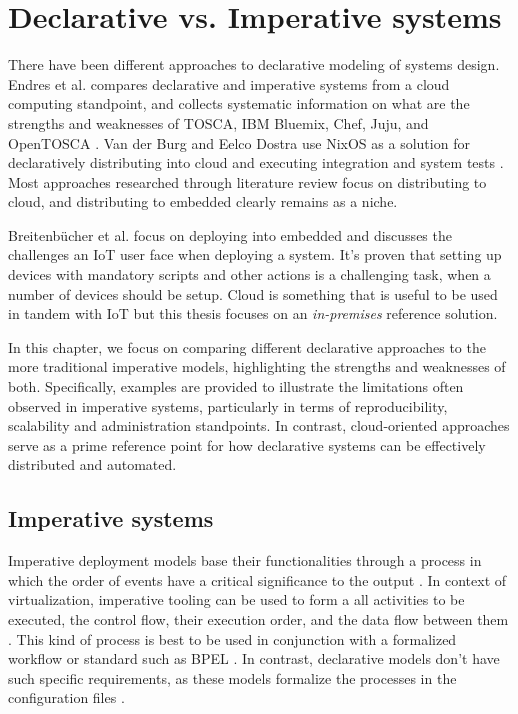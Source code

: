 \chapter{Declarative vs. Imperative systems} \label{imperative}

There have been different approaches to declarative modeling of systems design. Endres et al. compares declarative and imperative systems from a cloud computing standpoint, and collects systematic information on what are the strengths and weaknesses of TOSCA, IBM Bluemix, Chef, Juju, and OpenTOSCA \cite{endres2017declarative}. Van der Burg and Eelco Dostra use NixOS as a solution for declaratively distributing into cloud and executing integration and system tests \cite{van2010declarative}. Most approaches researched through literature review focus on distributing to cloud, and distributing to embedded clearly remains as a niche.

Breitenbücher et al. focus on deploying into embedded and discusses the challenges an IoT user face when deploying a system. It's proven that setting up devices with mandatory scripts and other actions is a challenging task, when a number of devices should be setup. Cloud is something that is useful to be used in tandem with IoT but this thesis focuses on an \textit{in-premises} reference solution. \cite{breitenbucher2017declarative}

In this chapter, we focus on comparing different declarative approaches to the more traditional imperative models, highlighting the strengths and weaknesses of both. Specifically, examples are provided to illustrate the limitations often observed in imperative systems, particularly in terms of reproducibility, scalability and administration standpoints. In contrast, cloud-oriented approaches serve as a prime reference point for how declarative systems can be effectively distributed and automated.

\section{Imperative systems}

Imperative deployment models base their functionalities through a process in which the order of events have a critical significance to the output \cite{breitenbucher2017declarative}. In context of virtualization, imperative tooling can be used to form a all activities to be executed, the control flow, their execution order, and the data flow between them \cite{endres2017declarative}. This kind of process is best to be used in conjunction with a formalized workflow or standard such as BPEL \cite{endres2017declarative}. In contrast, declarative models don't have such specific requirements, as these models formalize the processes in the configuration files \cite{endres2017declarative}.

